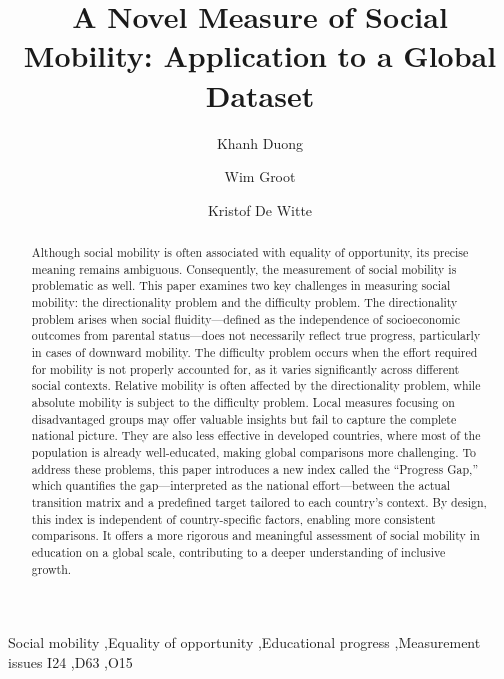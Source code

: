 \documentclass[3p,authoryear,11pt]{elsarticle}
\theoremstyle{definition}
\begin{document}
\begin{frontmatter}

\title{A Novel Measure of Social Mobility: Application to a Global Dataset}

\tnotetext[t1]{}

\author[1]{Khanh Duong}
\author[1]{Wim Groot}
\author[1,2]{Kristof De Witte}




    \begin{abstract}

    \noindent  Although social mobility is often associated with equality of opportunity, its precise meaning remains ambiguous. Consequently, the measurement of social mobility is problematic as well. This paper examines two key challenges in measuring social mobility: the directionality problem and the difficulty problem. The directionality problem arises when social fluidity—defined as the independence of socioeconomic outcomes from parental status—does not necessarily reflect true progress, particularly in cases of downward mobility. The difficulty problem occurs when the effort required for mobility is not properly accounted for, as it varies significantly across different social contexts. Relative mobility is often affected by the directionality problem, while absolute mobility is subject to the difficulty problem. Local measures focusing on disadvantaged groups may offer valuable insights but fail to capture the complete national picture. They are also less effective in developed countries, where most of the population is already well-educated, making global comparisons more challenging. To address these problems, this paper introduces a new index called the ``Progress Gap,'' which quantifies the gap—interpreted as the national effort—between the actual transition matrix and a predefined target tailored to each country's context. By design, this index is independent of country-specific factors, enabling more consistent comparisons. It offers a more rigorous and meaningful assessment of social mobility in education on a global scale, contributing to a deeper understanding of inclusive growth.
    
    \end{abstract}

    \begin{keyword}
    Social mobility \sep Equality of opportunity \sep Educational progress \sep Measurement issues
    \JEL I24 \sep D63 \sep O15 
    \end{keyword}

\end{frontmatter}


\end{document}
